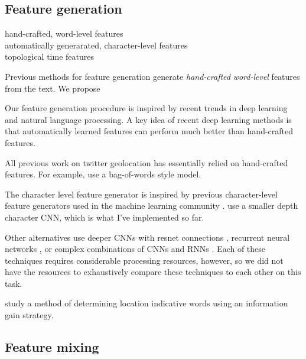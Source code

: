\documentclass{article}
\begin{document}
\subsection{Feature generation}

\begin{description}
    \item[hand-crafted, word-level features]
    \item[automatically generarated, character-level features]
    \item[topological time features]
\end{description}
Previous methods for feature generation generate \emph{hand-crafted} \emph{word-level} features from the text.
We propose 

Our feature generation procedure is inspired by recent trends in deep learning and natural language processing.
A key idea of recent deep learning methods is that automatically learned features can perform much better than hand-crafted features.

All previous work on twitter geolocation has essentially relied on hand-crafted features.
For example, \citet{} use a bag-of-words style model.

The character level feature generator is inspired by previous character-level feature generators used in the machine learning community \citep{}.
\citet{zhang2015character} use a smaller depth character CNN, which is what I've implemented so far.

Other alternatives use deeper CNNs with resnet connections \citep{conneau2017very}, recurrent neural networks \citep{chung2016character}, or complex combinations of CNNs and RNNs \citep{kim2016character,jozefowicz2016exploring}.
Each of these techniques requires considerable processing resources, however, 
so we did not have the resources to exhaustively compare these techniques to each other on this task.

\citet{han2012geolocation} study a method of determining location indicative words using an information gain strategy.

\subsection{Feature mixing}
\end{document}
